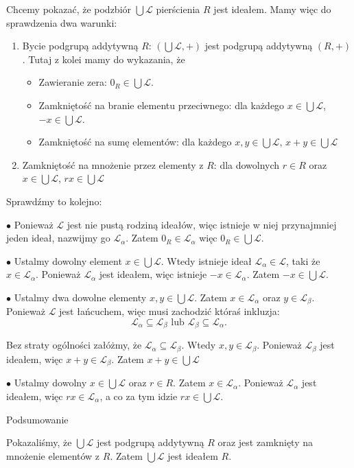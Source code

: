 \begin{solution}
       Chcemy pokazać, że podzbiór $\bigcup \mathcal{L}$ pierścienia $R$ jest ideałem. Mamy więc do sprawdzenia dwa warunki:
       \begin{enumerate}[label=\arabic*.]
	\item Bycie podgrupą addytywną $R$: $\left(\bigcup\mathcal{L}, + \right) $ jest podgrupą addytywną $\left( R, + \right) $.
		Tutaj z kolei mamy do wykazania, że
		\begin{itemize}
			\item Zawieranie zera: $0_{R} \in \bigcup \mathcal{L}$.
			\item Zamkniętość na branie elementu przeciwnego: dla każdego $x \in \bigcup \mathcal{L}$, $-x \in \bigcup \mathcal{L}$.
			\item Zamkniętość na sumę elementów: dla każdego $x,y \in \bigcup \mathcal{L}$, $x+y \in \bigcup\mathcal{L}$
		\end{itemize}
	\item Zamkniętość na mnożenie przez elementy z $R$: dla dowolnych $r\in R$ oraz $x \in \bigcup \mathcal{L}$, $rx \in \bigcup \mathcal{L}$
       \end{enumerate}

       Sprawdźmy to kolejno:

       \noindent$\bullet$ Ponieważ $\mathcal{L}$ jest nie pustą rodziną ideałów, więc istnieje w niej przynajmniej jeden ideał, nazwijmy go $\mathcal{L}_{\alpha }$. Zatem $0_{R} \in \mathcal{L}_{\alpha }$ więc $0_{R}\in \bigcup \mathcal{L}$.

       \noindent$\bullet$ Ustalmy dowolny element $x\in \bigcup \mathcal{L}$. Wtedy istnieje ideał $\mathcal{L}_{\alpha} \in \mathcal{L}$, taki że $x\in \mathcal{L}_{\alpha }$. Ponieważ $\mathcal{L}_{\alpha }$ jest ideałem, więc istnieje $-x \in \mathcal{L}_{\alpha }$. Zatem $-x \in \bigcup \mathcal{L}$.

       \noindent$\bullet$ Ustalmy dwa dowolne elementy $x,y \in \bigcup \mathcal{L}$. Zatem $x\in \mathcal{L}_{\alpha }$ oraz $y \in \mathcal{L}_{\beta }$. Ponieważ $\mathcal{L}$ jest łańcuchem, więc musi zachodzić któraś inkluzja:
       \[
       \mathcal{L}_{\alpha }\subseteq \mathcal{L}_{\beta }\text{ lub } \mathcal{L}_{\beta } \subseteq \mathcal{L}_{\alpha }
       .\] 

       Bez straty ogólności załóżmy, że $\mathcal{L}_{\alpha }\subseteq \mathcal{L}_{\beta }$. Wtedy $x,y \in \mathcal{L}_{\beta}$. Ponieważ $\mathcal{L}_{\beta }$ jest ideałem, więc $x+y \in \mathcal{L}_{\beta}$. Zatem $x+y \in \bigcup \mathcal{L}$

       \noindent$\bullet$ Ustalmy dowolny $x \in \bigcup \mathcal{L}$ oraz $r \in R$. Zatem  $x \in \mathcal{L}_{\alpha}$. Ponieważ $\mathcal{L}_{\alpha }$ jest ideałem, więc $rx \in \mathcal{L}_{\alpha }$, a co za tym idzie $rx \in \bigcup \mathcal{L}$.

       \noindent Podsumowanie

       Pokazaliśmy, że $\bigcup \mathcal{L}$ jest podgrupą addytywną $R$ oraz jest zamknięty na mnożenie elementów z $R$. Zatem $\bigcup \mathcal{L}$ jest ideałem $R$.
\end{solution} 
